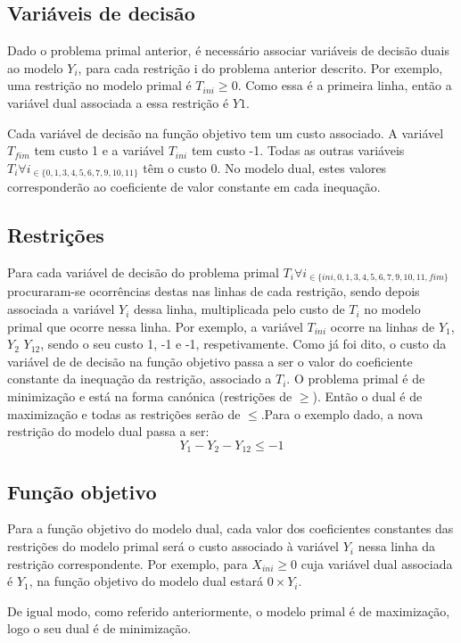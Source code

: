 \subsection{Variáveis de decisão}

Dado o problema primal anterior, é  necessário associar variáveis de decisão
duais ao modelo $Y_i$, para cada restrição i do problema anterior descrito. Por
exemplo, uma restrição no modelo primal é $T_{ini} \ge 0$. Como essa é a primeira
linha, então a variável dual associada a essa restrição é $Y1$.

Cada variável de decisão na função objetivo tem um custo associado. A variável
$T_{fim}$ tem custo 1 e a variável $T_{ini}$ tem custo -1. Todas as outras variáveis
$T_i \forall i_{\in\{0, 1, 3, 4,5,6,7,9,10,11\}}$ têm o custo 0. No modelo dual,
estes valores corresponderão ao coeficiente de valor constante em cada
inequação.

\subsection{Restrições}
Para cada variável de decisão do problema primal $ T_i \forall i_{\in\{ini, 0,
1, 3,4,5,6,7,9,10,11,fim\}}$ procuraram-se ocorrências destas nas linhas de cada
restrição, sendo depois associada a variável $Y_i$ dessa linha, multiplicada
pelo custo de $T_i$ no modelo primal que ocorre nessa linha. Por exemplo,
a variável $T_{ini}$ ocorre na linhas de $Y_1$, $Y_2$ $Y_{12}$, sendo o seu
custo 1, -1 e -1, respetivamente. Como já foi dito, o custo da variável de de
decisão na função objetivo passa a ser o valor do coeficiente constante da
inequação da restrição, associado a $T_i$. O problema primal é de minimização
e está na forma canónica (restrições de $\ge$). Então o dual é de maximização
e todas as restrições serão de $\le$.Para o exemplo dado, a nova restrição do
modelo dual passa a ser: $$Y_1 - Y_2 - Y_{12} \le -1$$


\subsection{Função objetivo}
Para a função objetivo do modelo dual, cada valor dos coeficientes constantes
das restrições do modelo primal será o custo associado à variável $Y_i$ nessa
linha da restrição correspondente. Por exemplo, para $X_{ini} \ge 0$ cuja
variável dual associada é $Y_1$, na função objetivo do modelo dual estará
$0 \times Y_i$.

De igual modo, como referido anteriormente, o modelo primal é de maximização,
logo o seu dual é de minimização.

